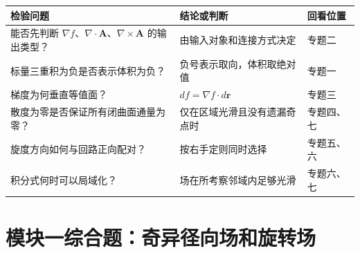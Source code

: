 {\def\LTcaptype{none} %
\begin{longtable}[]{@{}
  >{\raggedright\arraybackslash}p{}
  >{\raggedright\arraybackslash}p{}
  >{\raggedright\arraybackslash}p{}@{}}
\toprule\noalign{}
\begin{minipage}[b]{\linewidth}\raggedright
检验问题
\end{minipage} & \begin{minipage}[b]{\linewidth}\raggedright
结论或判断
\end{minipage} & \begin{minipage}[b]{\linewidth}\raggedright
回看位置
\end{minipage} \\
\midrule\noalign{}
\endhead
\bottomrule\noalign{}
\endlastfoot
能否先判断
\(\nabla f\)、\(\nabla\cdot\mathbf A\)、\(\nabla\times\mathbf A\)
的输出类型？ & 由输入对象和连接方式决定 & 专题二 \\
标量三重积为负是否表示体积为负？ & 负号表示取向，体积取绝对值 &
专题一 \\
梯度为何垂直等值面？ & \(df=\nabla f\cdot d\mathbf r\) & 专题三 \\
散度为零是否保证所有闭曲面通量为零？ & 仅在区域光滑且没有遗漏奇点时 &
专题四、七 \\
旋度方向如何与回路正向配对？ & 按右手定则同时选择 & 专题五、六 \\
积分式何时可以局域化？ & 场在所考察邻域内足够光滑 & 专题六、七 \\
\end{longtable}
}

\section{模块一综合题：奇异径向场和旋转场}\label{m1:ux6a21ux5757ux4e00ux7efcux5408ux9898ux5947ux5f02ux5f84ux5411ux573aux548cux65cbux8f6cux573a}

